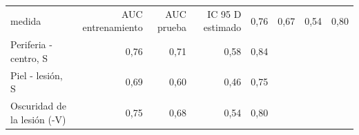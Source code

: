 \begin{tabular}{lrrrr}
\toprule
medida & AUC entrenamiento & AUC prueba & IC 95 %
\midrule
D estimado & 0{,}76 & 0{,}67 & 0{,}54 & 0{,}80 \\
Periferia - centro, S & 0{,}76 & 0{,}71 & 0{,}58 & 0{,}84 \\
Piel - lesión, S & 0{,}69 & 0{,}60 & 0{,}46 & 0{,}75 \\
Oscuridad de la lesión (-V) & 0{,}75 & 0{,}68 & 0{,}54 & 0{,}80 \\
\bottomrule
\end{tabular}
